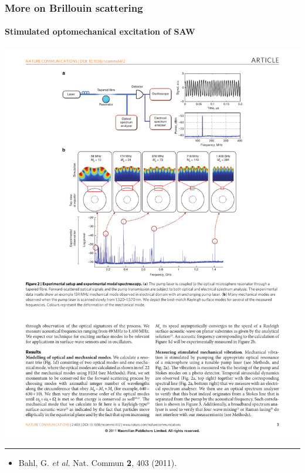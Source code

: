 \documentclass{beamer}
\def\etal{\emph{et al. }}
\begin{document}
\begin{frame}
\frametitle{More on Brillouin scattering}
\framesubtitle{Stimulated optomechanical excitation of SAW}
\begin{center}
\includegraphics[width=0.8\columnwidth]{f5.pdf}
\end{center}


\noindent\rule{0.1\textwidth}{0.5pt}

\begin{itemize}
\item \tiny{Bahl, G. \etal Nat. Commun \textbf{2}, 403 (2011).
}
\end{itemize}
\end{frame}

\end{document}
